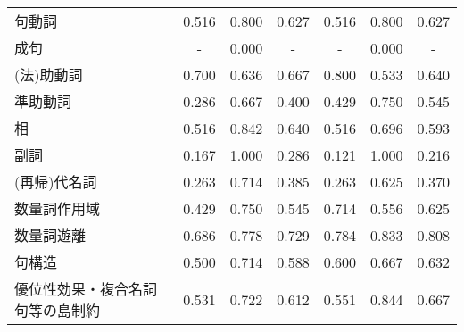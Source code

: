 \begin{table}[H]
\begin{tabular}{lcccccc}
    句動詞 & 0.516 & 0.800 & 0.627 & 0.516 & 0.800 & 0.627 \\
    成句 & - & 0.000 & - & - & 0.000 & - \\
    (法)助動詞 & 0.700 & 0.636 & 0.667 & 0.800 & 0.533 & 0.640 \\
    準助動詞 & 0.286 & 0.667 & 0.400 & 0.429 & 0.750 & 0.545 \\
    相 & 0.516 & 0.842 & 0.640 & 0.516 & 0.696 & 0.593 \\
    副詞 & 0.167 & 1.000 & 0.286 & 0.121 & 1.000 & 0.216 \\
    (再帰)代名詞 & 0.263 & 0.714 & 0.385 & 0.263 & 0.625 & 0.370 \\
    数量詞作用域 & 0.429 & 0.750 & 0.545 & 0.714 & 0.556 & 0.625 \\
    数量詞遊離 & 0.686 & 0.778 & 0.729 & 0.784 & 0.833 & 0.808 \\
    句構造 & 0.500 & 0.714 & 0.588 & 0.600 & 0.667 & 0.632 \\
    優位性効果・複合名詞句等の島制約 & 0.531 & 0.722 & 0.612 & 0.551 & 0.844 & 0.667 \\
    \hline
    \end{tabular}
\end{table}
